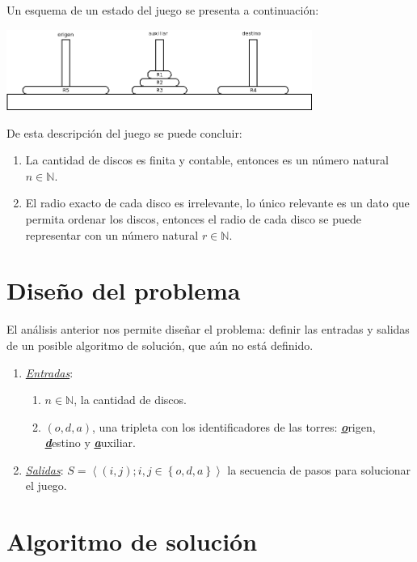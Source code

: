 \documentclass[twoside,spanish]{elsarticle}
\theoremstyle{plain}
\theoremstyle{definition}
\begin{document}
Un esquema de un estado del juego se presenta a continuación:
\begin{center}
\includegraphics[width=0.75\textwidth]{hanoi_schema}
\par\end{center}

De esta descripción del juego se puede concluir:
\begin{enumerate}
\item La cantidad de discos es finita y contable, entonces es un número
natural $n\in\mathbb{N}$.
\item El radio exacto de cada disco es irrelevante, lo único relevante es
un dato que permita ordenar los discos, entonces el radio de cada
disco se puede representar con un número natural $r\in\mathbb{N}$.
\end{enumerate}

\section{Diseño del problema}

El análisis anterior nos permite diseñar el problema: definir las
entradas y salidas de un posible algoritmo de solución, que aún no
está definido.
\begin{enumerate}
\item \emph{\uline{Entradas}}:
\begin{enumerate}
\item $n\in\mathbb{N}$, la cantidad de discos.
\item $\left(o,d,a\right)$, una tripleta con los identificadores de las
torres: \textbf{\emph{\uline{o}}}rigen, \textbf{\emph{\uline{d}}}estino
y \textbf{\emph{\uline{a}}}uxiliar.
\end{enumerate}
\item \emph{\uline{Salidas}}: $S=\left\langle \left(i,j\right);i,j\in\left\{ o,d,a\right\} \right\rangle $
la secuencia de pasos para solucionar el juego.
\end{enumerate}

\section{Algoritmo de solución}
\end{document}

